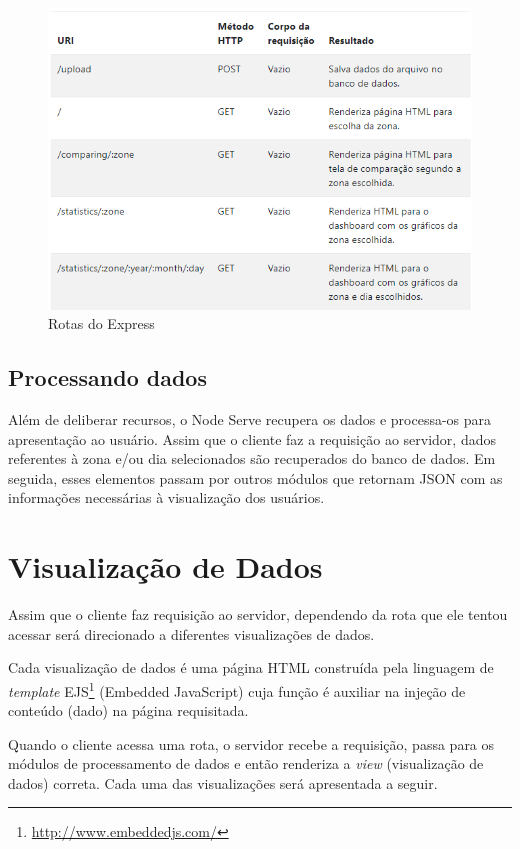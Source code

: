 \begin{figure}[!h]
  \caption{\label{rotas}Rotas do Express}
  \begin{center}
    \includegraphics[width=1.0\textwidth]{img/rotas.png}
  \end{center}
\end{figure}

\subsection{Processando dados}
Além de deliberar recursos, o Node Serve recupera os dados e processa-os para
apresentação ao usuário. Assim que o cliente faz a requisição ao servidor, dados
referentes à zona e/ou dia selecionados são recuperados do banco de dados. Em
seguida, esses elementos passam por outros módulos que retornam JSON com as
informações necessárias à visualização dos usuários.

\section{Visualização de Dados}
\label{data-view}
Assim que o cliente faz requisição ao servidor, dependendo da rota que ele tentou acessar será direcionado
a diferentes visualizações de dados.

Cada visualização de dados é uma página HTML construída pela
linguagem de \emph{template} EJS\footnote{\url{http://www.embeddedjs.com/}} (Embedded JavaScript) cuja função é
auxiliar na injeção de conteúdo (dado) na página requisitada.

Quando o cliente acessa uma rota, o servidor recebe a requisição, passa para os
módulos de processamento de dados e então renderiza a \emph{view} (visualização de dados) correta. Cada
uma das visualizações será apresentada a seguir.

